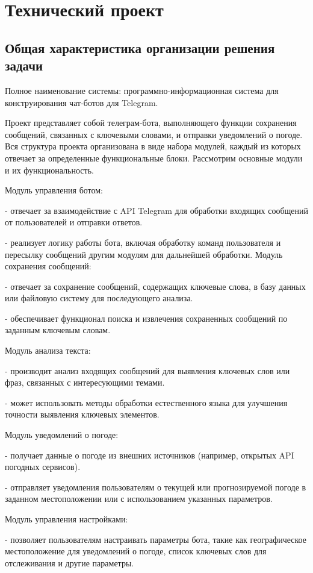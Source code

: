 \newsection
\section{Технический проект}
\subsection{Общая характеристика организации решения задачи}

Полное наименование системы: программно-информационная система для конструирования чат-ботов для Telegram.

Проект представляет собой телеграм-бота, выполняющего функции сохранения сообщений, связанных с ключевыми словами, и отправки уведомлений о погоде. Вся структура проекта организована в виде набора модулей, каждый из которых отвечает за определенные функциональные блоки. Рассмотрим основные модули и их функциональность. 

Модуль управления ботом:

- отвечает за взаимодействие с API Telegram для обработки входящих сообщений от пользователей и отправки ответов.

- реализует логику работы бота, включая обработку команд пользователя и пересылку сообщений другим модулям для дальнейшей обработки.
Модуль сохранения сообщений:

- отвечает за сохранение сообщений, содержащих ключевые слова, в базу данных или файловую систему для последующего анализа.

- обеспечивает функционал поиска и извлечения сохраненных сообщений по заданным ключевым словам.

Модуль анализа текста:

- производит анализ входящих сообщений для выявления ключевых слов или фраз, связанных с интересующими темами.

- может использовать методы обработки естественного языка для улучшения точности выявления ключевых элементов.

Модуль уведомлений о погоде:

- получает данные о погоде из внешних источников (например, открытых API погодных сервисов).

- отправляет уведомления пользователям о текущей или прогнозируемой погоде в заданном местоположении или с использованием указанных параметров.

Модуль управления настройками:

- позволяет пользователям настраивать параметры бота, такие как географическое местоположение для уведомлений о погоде, список ключевых слов для отслеживания и другие параметры.


